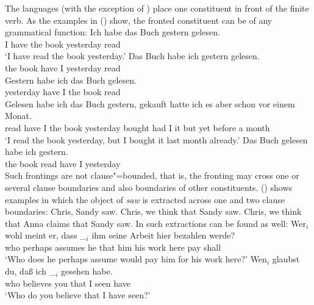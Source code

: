 The  languages (with the exception of ) place one constituent in front of the finite
verb. As the  examples in () show, the fronted constituent can be of any grammatical function:
\eal
\ex 
\gll Ich habe das Buch gestern gelesen.\\
     I have the book yesterday read\\\german
\glt `I have read the book yesterday.'
\ex 
\gll Das Buch habe ich gestern gelesen.\\
     the book have I yesterday read\\
\ex 
\gll Gestern habe ich das Buch gelesen.\\
     yesterday have I the book read\\
\ex 
\gll Gelesen habe ich das Buch gestern, gekauft hatte ich es aber schon vor einem Monat.\\
     read have I the book yesterday bought had I it but yet before a month\\
\glt `I read the book yesterday, but I bought it last month already.'
\ex 
\gll Das Buch gelesen habe ich gestern.\\
     the book read    have I yesterday\\
\zl
Such frontings are not clause"=bounded, that is, the fronting may cross one or several clause boundaries
and also boundaries of other constituents. () shows  examples in which the object of
\emph{saw} is extracted across one and two clause boundaries:
\eal
\ex\label{ex-chris-we-saw} Chris, Sandy saw.
\ex\label{ex-chris-we-think-that-sandy-saw} Chris, we think that Sandy saw.
\ex Chris, we think that Anna claims that Sandy saw.
\zl
In  such extractions can be found as well:
\eal
\label{ex-fernabhaengigkeit-one}
\ex 
\gll Wer$_i$ wohl    meint   er, dass \_$_i$ ihm seine Arbeit hier bezahlen werde?\footnotemark\\
     who     perhaps assumes he  that {}     him his   work   here pay shall\\
\glt `Who does he perhaps assume would pay him for his work here?'
\ex
\label{ex-wen-glaubst-du-dass}
\gll Wen$_i$ glaubst du, daß ich \_$_i$ gesehen habe.\footnotemark\\
     who believes you that I {} seen have\\\german
{}
\glt `Who do you believe that I have seen?'

